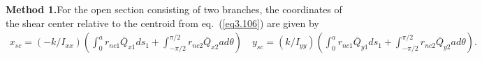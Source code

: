 \documentclass{AeroStructure-ERJohnson}
\begin{document}
\begin{example}\label{ex3.3}\setcounter{equation}{0}\def\theequation{\alph{equation}}\textbf{Method 1.}{\quad}For the open section consisting of two branches, the coordinates of the shear center relative to the centroid from eq.~(\ref{eq3.106}) are given by
\begin{align*}
x_{s c}=\left(-k / I_{x x}\right)\left(\int_{0}^{a} r_{n c 1} \bar{Q}_{x 1} d s_{1}+\int_{-\pi / 2}^{\pi / 2} r_{n c 2} \bar{Q}_{x 2} a d \theta\right) \quad y_{s c}=\left(k / I_{y y}\right)\left(\int_{0}^{a} r_{n c 1} \bar{Q}_{y 1} d s_{1}+\int_{-\pi / 2}^{\pi / 2} r_{n c 2} \bar{Q}_{y 2} a d \theta\right).
\end{align*}
\vspace*{2pt}
\clearpage


\end{example}
\end{document}

